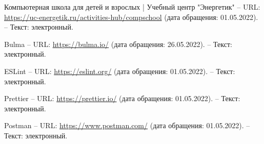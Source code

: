 \begin{thebibliography}{00}
        Компьютерная школа для детей и взрослых | Учебный центр "Энергетик"
        --
        URL:
        \href{https://uc-energetik.ru/activities-hub/compschool}{https://uc-energetik.ru/activities-hub/compschool}
        (дата обращения: 01.05.2022).
        --
        Текст: электронный.

        Bulma
        --
        URL:
        \href{https://bulma.io/}{https://bulma.io/}
        (дата обращения: 26.05.2022).
        --
        Текст: электронный.

        ESLint
        --
        URL:
        \href{https://eslint.org/}{https://eslint.org/}
        (дата обращения: 01.05.2022).
        --
        Текст: электронный.

        Prettier
        --
        URL:
        \href{https://prettier.io/}{https://prettier.io/}
        (дата обращения: 01.05.2022).
        --
        Текст: электронный.

        Postman
        --
        URL:
        \href{https://www.postman.com/}{https://www.postman.com/}
        (дата обращения: 01.05.2022).
        --
        Текст: электронный.

        

\begin{comment}

    \bibitem{livejournal}
        Главное - ЖЖ
        [Электронный ресурс] //
        LiveJournal — сервис для ведения блога и развития сообщества
        --
        Режим доступа:
        \href{https://www.livejournal.com/}{https://www.livejournal.com/}
        
    \bibitem{kickstarter}
        Kickstarter
        [Электронный ресурс] //
        Kickstarter - краудфандинговая платформа.
        --
        Режим доступа:
        \href{https://www.kickstarter.com/}{https://www.kickstarter.com/}

    \bibitem{ozon}
        OZON — интернет-магазин. Миллионы товаров по выгодным ценам
        [Электронный ресурс] //
        OZON. Интернет магазин
        --
        Режим доступа:
        \href{https://www.ozon.ru/}{https://www.ozon.ru/}

    \bibitem{stepik}
        Stepik
        [Электронный ресурс] //
        Stepik - интернет платформа для создания и распространения обучающего контента
        --
        Режим доступа:
        \href{https://stepik.org}{https://stepik.org/}


\end{comment}
\end{thebibliography}
